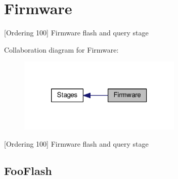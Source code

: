 \hypertarget{group__Firmware}{\section{Firmware}
\label{group__Firmware}
}


\mbox{[}Ordering 100\mbox{]} Firmware flash and query stage  


Collaboration diagram for Firmware\-:
\nopagebreak
\begin{figure}[H]
\begin{center}
\leavevmode
\includegraphics[width=222pt]{group__Firmware}
\end{center}
\end{figure}
\mbox{[}Ordering 100\mbox{]} Firmware flash and query stage \hypertarget{FooFlash.py_FooFlash}{}\subsection{Foo\-Flash}\label{FooFlash.py_FooFlash}
